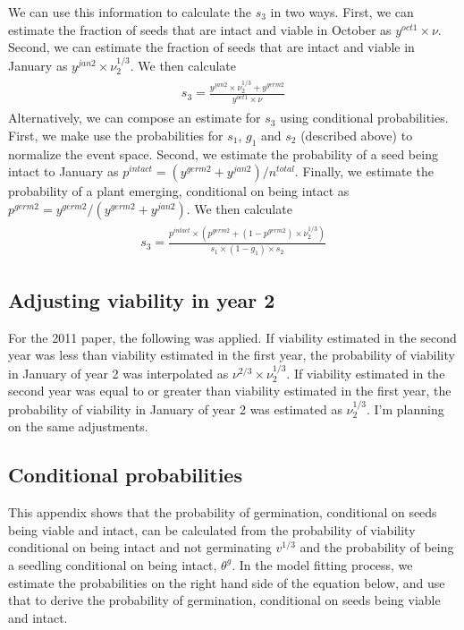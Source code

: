 \documentclass[12pt, oneside]{article}   	%
\begin{document}
We can use this information to calculate the $s_3$ in two ways. First, we can estimate the fraction of seeds that are intact and viable in October as $y^{oct1}\times \nu$. Second, we can estimate the fraction of seeds that are intact and viable in January as $y^{jan2}\times \nu_2^{1/3}$. We then calculate 
%
    \begin{align}
\begin{split}
s_3 = \frac{y^{jan2}\times \nu_2^{1/3} + y^{germ2}}{y^{oct1}\times \nu}
  \end{split}
\end{align}
%
Alternatively, we can compose an estimate for $s_3$ using conditional probabilities. First, we make use the probabilities for $s_1$, $g_1$ and $s_2$ (described above) to normalize the event space. Second, we estimate the probability of a seed being intact to January as $p^{intact} = (y^{germ2}+y^{jan2})/n^{total}$. Finally, we estimate the probability of a plant emerging, conditional on being intact as $p^{germ2} = y^{germ2}/(y^{germ2}+y^{jan2})$. We then calculate 
%
    \begin{align}
\begin{split}
s_3 = \frac{p^{intact} \times (p^{germ2} + ( 1- p^{germ2} ) \times \nu_2^{1/3} )}{s_1 \times (1-g_1) \times s_2 }
  \end{split}
\end{align}
%

\subsection*{Adjusting viability in year 2}

For the 2011 paper, the following was applied. If viability estimated in the second year was less than viability estimated in the first year, the probability of viability in January of year 2 was interpolated as $\nu^{2/3} \times \nu_2^{1/3} $. If viability estimated in the second year was equal to or greater than viability estimated in the first year, the probability of viability in January of year 2 was estimated as $\nu_2^{1/3} $. I'm planning on the same adjustments. 

\iffalse

\subsection*{Conditional probabilities}
This appendix shows that the probability of germination, conditional on seeds being viable and intact, can be calculated from the probability of viability conditional on being intact and not germinating $v^{1/3}$ and the probability of being a seedling conditional on being intact, $\theta^g$. In the model fitting process, we estimate the probabilities on the right hand side of the equation below, and use that to derive the probability of germination, conditional on seeds being viable and intact.
\end{document}
